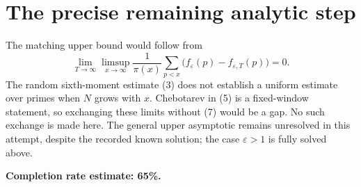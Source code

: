 \documentclass[11pt]{article}
\begin{document}
\section*{The precise remaining analytic step}
The matching upper bound would follow from
\[
 \lim_{T\to\infty}\limsup_{x\to\infty}
 \frac1{\pi(x)}\sum_{p<x}\bigl(f_\varepsilon(p)-f_{\varepsilon,T}(p)\bigr)=0. \tag{7}
\]
The random sixth-moment estimate (3) does not establish a uniform estimate over primes when $N$ grows with $x$. Chebotarev in (5) is a fixed-window statement, so exchanging these limits without (7) would be a gap. No such exchange is made here. The general upper asymptotic remains unresolved in this attempt, despite the recorded known solution; the case $\varepsilon>1$ is fully solved above.

\textbf{Completion rate estimate: 65\%.}
\end{document}
